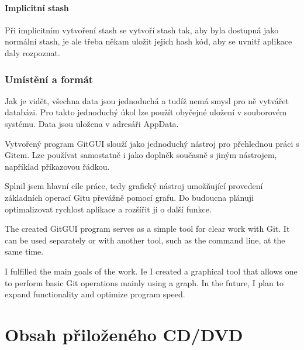 \documentclass[
  biblatex,
  glossaries,
  index
]{kidiplom}
\begin{document}
\paragraph*{Implicitní stash}
Při implicitním vytvoření stash se vytvoří stash tak, aby byla dostupná jako normální stash, je ale třeba někam uložit jejich hash kód, aby se uvnitř aplikace daly rozpoznat.

\subsubsection{Umístění a formát}
Jak je vidět, všechna data jsou jednoduchá a tudíž nemá smysl pro ně vytvářet databázi. Pro takto jednoduchý úkol lze použít obyčejné uložení v souborovém systému. Data jsou uložena v adresáři AppData.

\begin{kiconclusions}
Vytvořený program GitGUI slouží jako jednoduchý nástroj pro přehlednou práci s Gitem. Lze používat samostatně i jako doplněk současně s jiným nástrojem, například příkazovou řádkou.

Splnil jsem hlavní cíle práce, tedy grafický nástroj umožňující provedení základních operací Gitu převážně pomocí grafu. Do budoucna plánuji optimalizovat rychlost aplikace a rozšířit ji o další funkce.
\end{kiconclusions}

\begin{kiconclusions}[english]
The created GitGUI program serves as a simple tool for clear work with Git. It can be used separately or with another tool, such as the command line, at the same time.

I fulfilled the main goals of the work. Ie I created a graphical tool that allows one to perform basic Git operations mainly using a graph. In the future, I plan to expand functionality and optimize program speed.

\end{kiconclusions}

\appendix

\section{Obsah přiloženého CD/DVD} \label{sec:ObsahCD}
\end{document}
